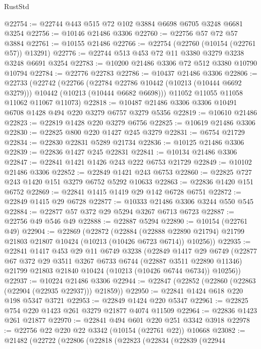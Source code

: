 \begin{lexlean}{RustStd}
\begin{coremodule}
{\begin{coremodule}
{{{{{{{{{{{{{{{{{{{{{{{{{{@22754 := @22744 @443 @515 @72 @102 @3884 @6698 @6705 @3248 @6681 @3254
@22756 := @10146 @21486 @3306
@22760 := @22756 @57 @72 @57 @3884
@22761 := @10155 @21486
@22766 := @22754 (@22760 (@10154 (@22761 @57)) @13291)
@22776 := @22744 @513 @453 @72 @11 @3380 @3279 @3238 @3248 @6691 @3254
@22783 := @10200 @21486 @3306 @72 @512 @3380 @10790 @10794
@22784 := @22776 @22783
@22786 := @10437 @21486 @3306
@22806 := @22733
    (@22742
      (@22766
        (@22784 @22786 @10442 (@10213 (@10444 @6692 @3279)))
        @10442
        (@10213 (@10444 @6682 @6698)))
      @11052
      @11055
      @11058
      @11062
      @11067
      @11073)
@22818 := @10487 @21486 @3306 @3306 @10491 @6708 @1428 @494 @220 @3279 @6757 @3279 @5356
@22819 := @10610 @21486
@22823 := @22819 @1428 @220 @3279 @6756
@22825 := @10619 @21486 @3306
@22830 := @22825 @800 @220 @1427 @245 @3279
@22831 := @6754 @21729
@22834 := @22830 @22831 @5289 @21734
@22836 := @10125 @21486 @3306
@22839 := @22836 @1427 @245 @22831
@22841 := @10134 @21486 @3306
@22847 := @22841 @1421 @1426 @243 @222 @6753 @21729
@22849 := @10102 @21486 @3306
@22852 := @22849 @1421 @243 @6753
@22860 := @22825 @727 @243 @1420 @151 @3279 @6752 @5292 @10633
@22863 := @22836 @1420 @151 @6752
@22869 := @22841 @1415 @1419 @29 @142 @6728 @6751
@22872 := @22849 @1415 @29 @6728
@22877 := @10333 @21486 @3306 @3244 @550 @545
@22884 := @22877 @57 @372 @29 @5294 @3267 @6713 @6723
@22887 := @22756 @49 @546 @49
@22888 := @22887 @5294
@22890 := @10154 (@22761 @49)
@22904 := @22869
    (@22872
      (@22884
        (@22888 @22890 @21794)
        @21799
        @21803
        @21807
        @10424
        (@10213 (@10426 @6723 @6714))
        @10256))
@22935 := @22841
    @1417
    @453
    @29
    @11
    @6749
    @3238
    (@22849
      @1417
      @29
      @6749
      (@22877
        @67
        @372
        @29
        @3511
        @3267
        @6733
        @6744
        (@22887 @3511 @22890 @11346)
        @21799
        @21803
        @21840
        @10424
        (@10213 (@10426 @6744 @6734))
        @10256))
@22937 := @10224 @21486 @3306
@22944 := @22847 (@22852 (@22860 (@22863 (@22904 (@22935 @22937))) @21859))
@22950 := @22841 @1424 @618 @220 @198 @5347 @3721
@22953 := @22849 @1424 @220 @5347
@22961 := @22825 @754 @220 @1423 @261 @3279 @21877 @4074 @11509
@22964 := @22836 @1423 @261 @21877
@22970 := @22841 @494 @601 @220 @251 @3342 @3918
@22978 := @22756 @22 @220 @22 @3342 (@10154 (@22761 @22)) @10668
@23082 := @21482
    (@22722
      (@22806
        (@22818
          (@22823
            (@22834
              (@22839
                (@22944
}}}}}}}}}}}}}}}}}}}}}}}}}}
\end{coremodule}}
\end{coremodule}
\end{lexlean}
